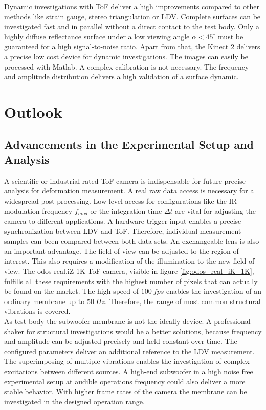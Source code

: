 Dynamic investigations with ToF deliver a high improvements compared to other methods like strain gauge, stereo triangulation or LDV. Complete surfaces can be investigated fast and in parallel without a direct contact to the test body. Only a highly diffuse reflectance surface under a low viewing angle $\alpha<45^\circ$ must be guaranteed for a high signal-to-noise ratio. Apart from that, the Kinect 2 delivers a precise low cost device for dynamic investigations. The images can easily be processed with Matlab. A complex calibration is not necessary. The frequency and amplitude distribution delivers a high validation of a surface dynamic.

\section{Outlook}
\subsection{Advancements in the Experimental Setup and Analysis}
A scientific or industrial rated ToF camera is indispensable for future precise analysis for deformation measurement. A real raw data access is necessary for a widespread post-processing. Low level access for configurations like the IR modulation frequency $f_{mod}$ or the integration time $\Delta t$ are vital for adjusting the camera to different applications. A hardware trigger input enables a precise synchronization between LDV and ToF. Therefore, individual measurement samples can been compared between both data sets. An exchangeable lens is also an important advantage. The field of view can be adjusted to the region of interest. This also requires a modification of the illumination to the new field of view. The odos real.iZ-1K ToF camera, visible in figure \ref{fig:odos_real_iK_1K}, fulfills all these requirements with the highest number of pixels that can actually be found on the market. The high speed of $100~fps$ enables the investigation of an ordinary membrane up to $50~Hz$. Therefore, the range of most common structural vibrations is covered.\\

As test body the subwoofer membrane is not the ideally device. A professional shaker for structural investigations would be a better solutions, because frequency and amplitude can be adjusted precisely and held constant over time. The configured parameters deliver an additional reference to the LDV measurement. The superimposing of multiple vibrations enables the investigation of complex excitations between different sources. A high-end subwoofer in a high noise free experimental setup at audible operations frequency could also deliver a more stable behavior. With higher frame rates of the camera the membrane can be investigated in the designed operation range.\\

